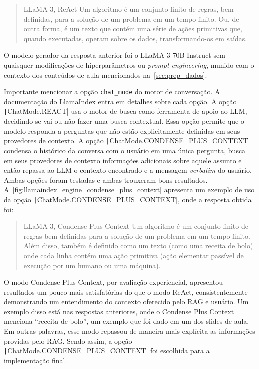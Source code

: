 \documentclass[journal]{IEEEtran}
\begin{document}
\begin{quote}{LLaMA 3, ReAct}
Um algoritmo é um conjunto finito de regras, bem definidas, para a solução de um problema em um tempo finito.
Ou, de outra forma, é um texto que contém uma série de ações primitivas que, quando executadas, operam sobre os dados, transformando-os em saídas.
\end{quote}

O modelo gerador da resposta anterior foi o LLaMA 3 70B Instruct sem quaisquer modificações de hiperparâmetros ou \textit{prompt engineering}, munido com o contexto dos conteúdos de aula mencionados na~\cref{sec:prep_dados}.

Importante mencionar a opção \texttt{chat\_mode} do motor de conversação.
A documentação do LlamaIndex entra em detalhes sobre cada opção.
A opção \texttt|ChatMode.REACT| usa o motor de busca como ferramenta de apoio ao LLM, decidindo se vai ou não fazer uma busca contextual.
Essa opção permite que o modelo responda a perguntas que não estão explicitamente definidas em seus provedores de contexto.
A opção \texttt|ChatMode.CONDENSE_PLUS_CONTEXT| condensa o histórico da conversa com o usuário em uma única pergunta, busca em seus provedores de contexto informações adicionais sobre aquele assunto e então repassa ao LLM o contexto encontrado e a mensagem \textit{verbatim} do usuário.
Ambas opções foram testadas e ambas trouxeram bons resultados.
A~\cref{fig:llamaindex_engine_condense_plus_context} apresenta um exemplo de uso da opção \texttt|ChatMode.CONDENSE_PLUS_CONTEXT|, onde a resposta obtida foi:

\begin{quote}{LLaMA 3, Condense Plus Context}
Um algoritmo é um conjunto finito de regras bem definidas para a solução de um problema em um tempo finito.
Além disso, também é definido como um texto (como uma receita de bolo) onde cada linha contém uma ação primitiva (ação elementar passível de execução por um humano ou uma máquina).
\end{quote}

O modo Condense Plus Context, por avaliação experiencial, apresentou resultados um pouco mais satisfatórias do que o modo ReAct, consistentemente demonstrando um entendimento do contexto oferecido pelo RAG e usuário.
Um exemplo disso está nas respostas anteriores, onde o Condense Plus Context menciona ``receita de bolo'', um exemplo que foi dado em um dos slides de aula.
Em outras palavras, esse modo repassou de maneira mais explícita as informações providas pelo RAG\@.
Sendo assim, a opção \texttt|ChatMode.CONDENSE_PLUS_CONTEXT| foi escolhida para a implementação final.
\end{document}
